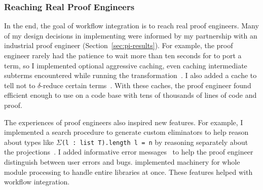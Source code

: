 \subsubsection{Reaching Real Proof Engineers}
\label{sec:engineers}

In the end, the goal of workflow integration is to reach real proof engineers.
Many of my design decisions in implementing \toolnamec were informed by my partnership with
an industrial proof engineer (Section~\ref{sec:pi-results}).
For example, the proof engineer rarely had the patience to wait more than ten seconds
for \toolnamec to port a term,
so I implemented optional aggressive caching, even caching intermediate subterms
encountered while running the transformation~\href{https://github.com/uwplse/pumpkin-pi/blob/v2.0.0/plugin/src/cache/caching.ml}{}. %
I also added a cache to tell \toolnamec not to $\delta$-reduce certain terms~\href{https://github.com/uwplse/pumpkin-pi/blob/v2.0.0/plugin/src/cache/caching.ml}{}.
With these caches, the proof engineer found \toolnamec efficient enough to use on a code base with tens of thousands of lines of code and proof.



The experiences of proof engineers also inspired new features.
For example, I implemented a search procedure to generate custom eliminators %
to help reason about types like $\Sigma$\lstinline{(l : list T).length l = n}
by reasoning separately about the projections~\href{https://github.com/uwplse/pumpkin-pi/blob/v2.0.0/plugin/src/automation/search/smartelim.ml}{}. %
I added informative error messages~\href{https://github.com/uwplse/pumpkin-pi/blob/v2.0.0/plugin/src/lib/ornerrors.ml}{} to help the proof engineer distinguish between user errors and bugs. %
 implemented machinery for whole module processing to handle entire libraries at once.
These features helped with workflow integration. %

